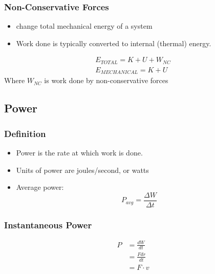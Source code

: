 \documentclass[../Notes.tex]{subfiles}
\begin{document}
\subsubsection{Non-Conservative Forces}
\begin{itemize}
    \item change total mechanical energy of a system 
    \item Work done is typically converted to internal (thermal) energy.
\end{itemize}
\begin{align*}
    E_{TOTAL} = K + U + W_{NC} \\ 
    E_{MECHANICAL} = K + U
\end{align*}
Where $W_{NC}$ is work done by non-conservative forces

\subsection{Power}

\subsubsection{Definition}
\begin{itemize}
	\item Power is the rate at which work is done.
	\item Units of power are joules/second, or watts
	\item Average power:
	\begin{equation*}
		P_{avg} = \frac{\Delta W}{\Delta t}
	\end{equation*}
\end{itemize}

\subsubsection{Instantaneous Power}
\begin{align*}
	P &= \frac{dW}{dt} \\
	&= \frac{Fdr}{dt} \\
	&= F \cdot v
\end{align*}
\end{document}
